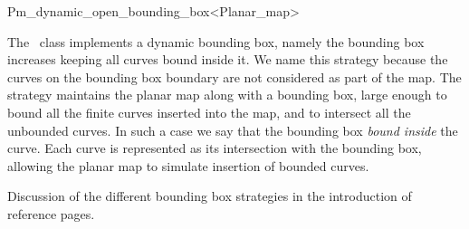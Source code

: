 
\ccRefPageBegin



\begin{ccRefClass}{Pm_dynamic_open_bounding_box<Planar_map>}
\label{Pm_ref:dynamic_open}

\ccDefinition
    The \ccRefName\ class 
    implements a dynamic bounding box, namely the bounding box increases 
    keeping all curves
    bound inside it. We name this strategy  because the curves on
    the bounding box boundary are not considered as part of the map.
    The  strategy maintains the planar map
    along with a bounding box, large enough to bound all the finite curves
    inserted into 
    the map, and to intersect all the unbounded curves. In such a case we 
    say that the 
    bounding box {\it bound inside} the curve.
    Each curve is represented as its intersection with the bounding box, 
    allowing the planar map to simulate insertion of bounded curves. 


\ccIsModel

\ccInheritsFrom

\ccSeeAlso
   Discussion of the different bounding box strategies in the introduction
of  reference pages.

\end{ccRefClass} %

\ccRefPageEnd
